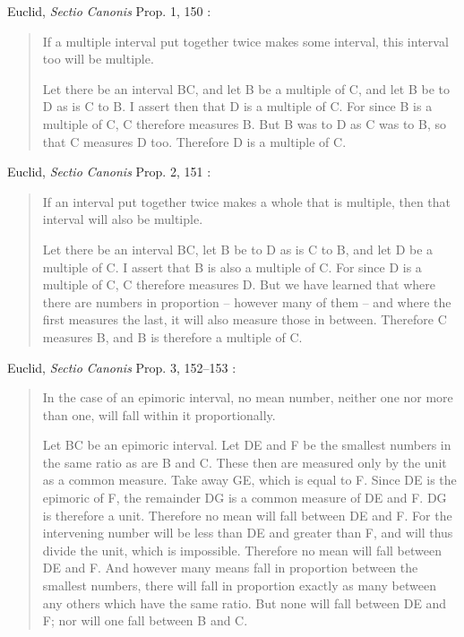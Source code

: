 \documentclass{article}
\theoremstyle{definition}
\begin{document}
Euclid, {\em Sectio Canonis} Prop. 1, 150 \cite[p.~194]{barker}:

\begin{quote}
If a multiple interval put together twice makes some
interval, this interval too will be multiple.

Let there be an interval BC, and let B be a multiple of C,
and let B be to D as is C to B. I assert then that D is a
multiple of C. For since B is a multiple of C, C therefore
measures B. But B was to D as C was to B, so that C
measures D too. Therefore D is a multiple of C.
\end{quote}

Euclid, {\em Sectio Canonis} Prop. 2, 151 \cite[p.~194]{barker}:

\begin{quote}
If an interval put together twice makes a whole that
is multiple, then that interval will also be multiple.

Let there be an interval BC, let B be to D as is C to B, and let D be a multiple
of C. I assert that B is also a multiple of C. For since D is a multiple of C, C
therefore measures D. But we have learned that where there are numbers in
proportion -- however many of them -- and where the first measures the last, it
will also measure those in between. Therefore C measures B, and B is therefore
a multiple of C.
\end{quote}

Euclid, {\em Sectio Canonis} Prop. 3, 152--153 \cite[p.~195]{barker}:

\begin{quote}
In the case of an epimoric interval, no mean number,
neither one nor more than one, will fall within it proportionally.

Let BC be an epimoric interval. Let DE and F be the smallest numbers in the
same ratio as are B and C. These then are measured only by the unit as a
common measure. Take away GE, which is equal to F. Since DE is the
epimoric of F, the remainder DG is a common measure of DE and F. DG is
therefore a unit. Therefore no mean will fall between DE and F. For the
intervening number will be less than DE and greater than F, and will thus divide
the unit, which is impossible. Therefore no mean will fall between DE and F.
And however many means fall in proportion between the smallest numbers,
there will fall in proportion exactly as many between any others which have the
same ratio. But none will fall between DE and F; nor will one fall between
B and C.
\end{quote}
\end{document}
